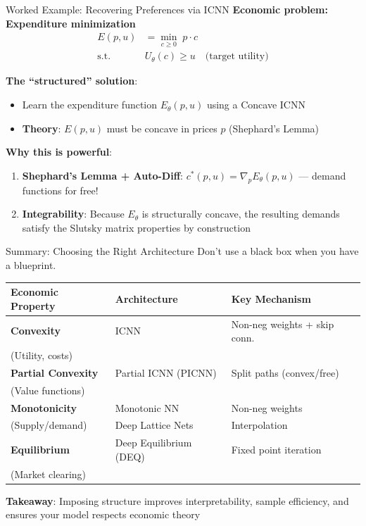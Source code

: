 \documentclass[10pt,english,aspectratio=169]{beamer}
\begin{document}
\begin{frame}{Worked Example: Recovering Preferences via ICNN}
\textbf{Economic problem: Expenditure minimization}
\begin{align*}
  E(p, u) &= \min_{c \geq 0}\; p \cdot c \\
  \text{s.t.}\quad & U_\theta(c) \geq u \quad \text{(target utility)}
\end{align*}

\textbf{The ``structured'' solution}:
\begin{itemize}
  \item Learn the expenditure function $E_\theta(p, u)$ using a Concave ICNN
  \item \textbf{Theory}: $E(p, u)$ must be concave in prices $p$ (Shephard's Lemma)
\end{itemize}

\textbf{Why this is powerful}:
\begin{enumerate}
  \item \textbf{Shephard's Lemma + Auto-Diff}: $c^*(p, u) = \nabla_p E_\theta(p, u)$ --- demand functions for free!
  \item \textbf{Integrability}: Because $E_\theta$ is structurally concave, the resulting demands satisfy the Slutsky matrix properties by construction
\end{enumerate}
\end{frame}

\begin{frame}{Summary: Choosing the Right Architecture}
Don't use a black box when you have a blueprint.

\vspace{0.3cm}
\begin{table}[]
\centering
\renewcommand{\arraystretch}{1.4}
\small
\begin{tabular}{l | l | l}
\textbf{Economic Property} & \textbf{Architecture} & \textbf{Key Mechanism} \\
\hline
\textbf{Convexity} & ICNN & Non-neg weights + skip conn. \\
(Utility, costs) & & \\
\hline
\textbf{Partial Convexity} & Partial ICNN (PICNN) & Split paths (convex/free) \\
(Value functions) & & \\
\hline
\textbf{Monotonicity} & Monotonic NN & Non-neg weights \\
(Supply/demand) & Deep Lattice Nets & Interpolation \\
\hline
\textbf{Equilibrium} & Deep Equilibrium (DEQ) & Fixed point iteration \\
(Market clearing) & & \\
\end{tabular}
\end{table}

\vspace{0.2cm}
\textbf{Takeaway}: Imposing structure improves interpretability, sample efficiency, and ensures your model respects economic theory
\end{frame}
\end{document}
